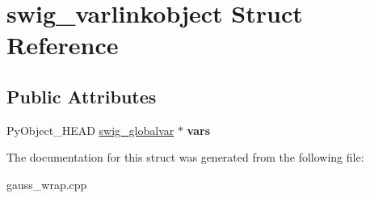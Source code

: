 \hypertarget{structswig__varlinkobject}{\section{swig\-\_\-varlinkobject Struct Reference}
\label{structswig__varlinkobject}
}
\subsection*{Public Attributes}
\begin{DoxyCompactItemize}
\item 
\hypertarget{structswig__varlinkobject_a8cf96d999cdf0b28a0e90ccb6804c9bd}{Py\-Object\-\_\-\-H\-E\-A\-D \hyperlink{structswig__globalvar}{swig\-\_\-globalvar} $\ast$ {\bfseries vars}}\label{structswig__varlinkobject_a8cf96d999cdf0b28a0e90ccb6804c9bd}

\end{DoxyCompactItemize}


The documentation for this struct was generated from the following file\-:\begin{DoxyCompactItemize}
\item 
gauss\-\_\-wrap.\-cpp\end{DoxyCompactItemize}
